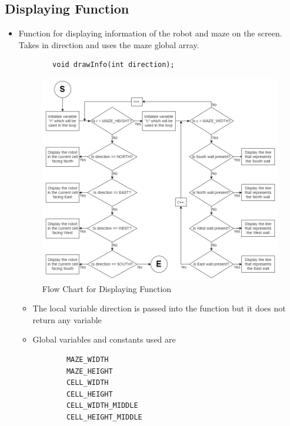\documentclass[11pt]{article}
\begin{document}
\subsection{Displaying Function}
\begin{itemize}
\item Function for displaying information of the robot and maze on the screen. Takes in direction and uses the maze global array. 
	\begin{verbatim}
		void drawInfo(int direction);
	\end{verbatim}
\begin{figure}[htp]
\centering
\includegraphics[scale=0.516]{images/Software_Flowchart/Drawing_Function.png}
\caption{Flow Chart for Displaying Function}
\label{}
\end{figure}
	\begin{itemize}
	\item The local variable direction is passed into the function but it does not return any variable
	\item Global variables and constants used are
	\begin{verbatim}
		MAZE_WIDTH
		MAZE_HEIGHT
		CELL_WIDTH
		CELL_HEIGHT
		CELL_WIDTH_MIDDLE
		CELL_HEIGHT_MIDDLE
	\end{verbatim}
	\end{itemize}
\end{itemize}
\newpage

\end{document}
